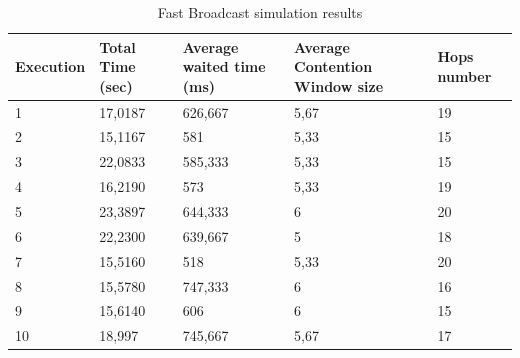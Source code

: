 \begin{table}
\caption{Fast Broadcast simulation results}
\label{tab:Android_res}
\centering
\begin{tabular}{|m{}|m{}|m{}|m{}|m{}|}
\hline
Execution & Total \newline Time (sec) & Average waited time (ms) & Average Contention Window size & Hops \newline number \\
\hline
1 & 17,0187 & 626,667 & 5,67 & 19 \\
\hline
2 & 15,1167 & 581	  & 5,33 & 15 \\
\hline
3 & 22,0833 & 585,333 & 5,33 & 15 \\
\hline
4 & 16,2190 & 573	  & 5,33 & 19 \\
\hline
5 & 23,3897 & 644,333 & 6	 & 20 \\
\hline
6 & 22,2300 & 639,667 & 5	 & 18 \\
\hline
7 & 15,5160 & 518	  & 5,33 & 20 \\
\hline
8 & 15,5780 & 747,333 & 6	 & 16 \\
\hline
9 & 15,6140 & 606     & 6	 & 15 \\
\hline
10 & 18,997 & 745,667 & 5,67 & 17 \\
\hline
\end{tabular}
\end{table}  
